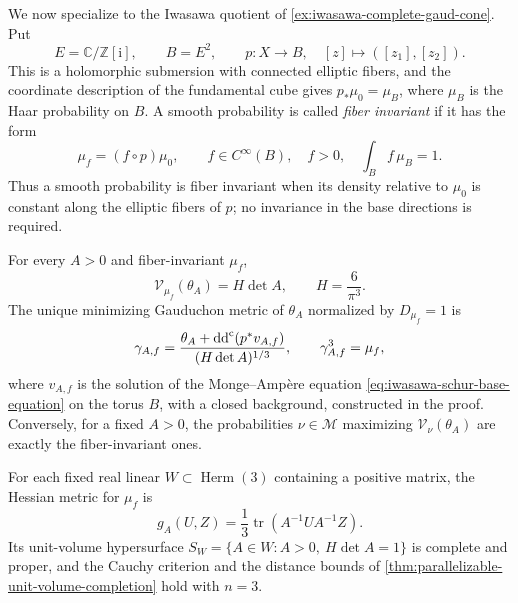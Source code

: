 We now specialize to the Iwasawa quotient of \cref{ex:iwasawa-complete-gaud-cone}. Put
\[
 E=\mathbb C/\mathbb Z[\mathrm i],\qquad B=E^2,\qquad
 p\colon X\longrightarrow B,\quad [z]\longmapsto([z_1],[z_2]).
\]
This is a holomorphic submersion with connected elliptic fibers, and the coordinate description of the fundamental cube gives $p_*\mu_0=\mu_B$, where $\mu_B$ is the Haar probability on $B$. A smooth probability is called \emph{fiber invariant} if it has the form
\[
 \mu_f=(f\circ p)\mu_0,\qquad f\in C^\infty(B),\quad
 f>0,\quad\int_B f\,\mu_B=1.
\]
Thus a smooth probability is fiber invariant when its density relative to $\mu_0$ is constant along the elliptic fibers of $p$; no invariance in the base directions is required.

\begin{theorem}\label{thm:iwasawa-fiber-invariant-density}
For every $A>0$ and fiber-invariant $\mu_f$,
\begin{equation}\label{eq:iwasawa-fiber-invariant-volume}
 \mathcal V_{\mu_f}(\theta_A)=H\det A,
 \qquad H=\frac6{\pi^3}.
\end{equation}
The unique minimizing Gauduchon metric of $\theta_A$ normalized by $D_{\mu_f}=1$ is
\begin{equation}\label{eq:iwasawa-fiber-invariant-minimizer}
 \gamma_{A,f}=\frac{\theta_A+\mathrm{dd}^{\mathrm{c}}(p^*v_{A,f})}{(H\det A)^{1/3}},
 \qquad\gamma_{A,f}^3=\mu_f,
\end{equation}
where $v_{A,f}$ is the solution of the Monge--Amp\`ere equation \eqref{eq:iwasawa-schur-base-equation} on the torus $B$, with a closed background, constructed in the proof. Conversely, for a fixed $A>0$, the probabilities $\nu\in\mathscr M$ maximizing $\mathcal V_\nu(\theta_A)$ are exactly the fiber-invariant ones.

For each fixed real linear $W\subset\operatorname{Herm}(3)$ containing a positive matrix, the Hessian metric for $\mu_f$ is
\[
 g_A(U,Z)=\frac13\operatorname{tr}(A^{-1}UA^{-1}Z).
\]
Its unit-volume hypersurface $S_W=\{A\in W:A>0,\ H\det A=1\}$ is complete and proper, and the Cauchy criterion and the distance bounds of \cref{thm:parallelizable-unit-volume-completion} hold with $n=3$.
\end{theorem}

